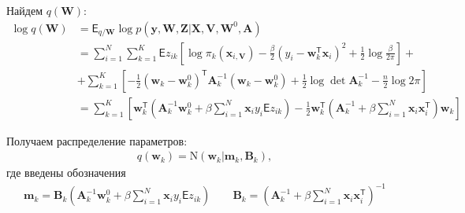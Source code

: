 \documentclass[12pt, twoside]{article}
\numberwithin{equation}{section}
\begin{document}
Найдем $q\left(\textbf{W}\right)$:
\begin{equation}
\label{eq:st:lin:4}
\begin{aligned}
\log q\left(\textbf{W}\right) &= \mathsf{E}_{q/\textbf{W}}\log p\left(\textbf{y}, \textbf{W}, \textbf{Z}|\textbf{X}, \textbf{V}, \textbf{W}^{0}, \textbf{A}\right) \\
&= \sum_{i=1}^{N}\sum_{k=1}^{K}\mathsf{E}z_{ik}\left[\log\pi_{k}\left(\textbf{x}_{i, \textbf{V}}\right) - \frac{\beta}{2}\left(y_{i} - \textbf{w}_{k}^{\mathsf{T}}\textbf{x}_{i}\right)^{2} + \frac{1}{2}\log\frac{\beta}{2\pi}\right] + \\
&+ \sum_{k=1}^{K}\left[-\frac{1}{2}\left(\textbf{w}_{k} - \textbf{w}_{k}^{0}\right)^{\mathsf{T}}\textbf{A}_{k}^{-1}\left(\textbf{w}_{k} - \textbf{w}_{k}^{0}\right) + \frac{1}{2}\log\det\textbf{A}^{-1}_{k} - \frac{n}{2}\log2\pi\right] \\
&= \sum_{k=1}^{K}\left[\textbf{w}_{k}^{\mathsf{T}}\left(\textbf{A}_{k}^{-1}\textbf{w}_{k}^{0}+\beta\sum_{i=1}^{N}\textbf{x}_{i}y_{i}\mathsf{E}z_{ik}\right)-\frac{1}{2}\textbf{w}_{k}^{\mathsf{T}}\left(\textbf{A}_{k}^{-1}+\beta\sum_{i=1}^{N}\textbf{x}_{i}\textbf{x}_{i}^{\mathsf{T}}\right)\textbf{w}_{k}\right]
\end{aligned}
\end{equation}

Получаем распределение параметров:
\begin{equation}
\label{eq:st:lin:5}
\begin{aligned}
q\left(\textbf{w}_{k}\right) = \text{N}\left(\textbf{w}_{k}| \textbf{m}_{k}, \textbf{B}_k\right), 
\end{aligned}
\end{equation}
где введены обозначения
\begin{equation}
\label{eq:st:lin:6}
\begin{aligned}
\textbf{m}_{k} = \textbf{B}_{k}\left(\textbf{A}_{k}^{-1}\textbf{w}_{k}^{0}+\beta\sum_{i=1}^{N}\textbf{x}_{i}y_{i}\mathsf{E}z_{ik}\right) \qquad \textbf{B}_{k} = \left(\textbf{A}_{k}^{-1}+\beta\sum_{i=1}^{N}\textbf{x}_{i}\textbf{x}_{i}^{\mathsf{T}}\right)^{-1}
\end{aligned}
\end{equation}
\end{document}
